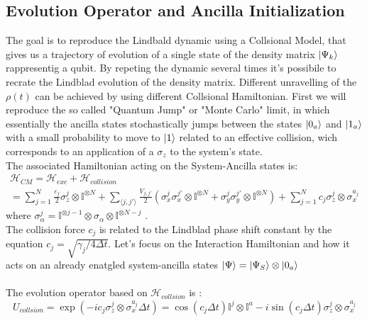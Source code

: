\documentclass[a4paper,12pt]{article}
\begin{document}
	\subsection{Evolution Operator and Ancilla Initialization}
	\label{sub:Evolution_Operator_and_Ancilla_Initialization_QJ}
	The goal is to reproduce the Lindbald dynamic using a Collsional Model, that gives us a trajectory of evolution of a single state of the density matrix $ \ket{\Psi_k} $ rappresentig a qubit. By repeting the dynamic several times it's possibile to recrate the Lindblad evolution of the density matrix.
	Different unravelling of the $ \rho (t) $ can be achieved by using different Collsional Hamiltonian. First we will reproduce the so called "Quantum Jump" or "Monte Carlo" limit, in which essentially the ancilla states stochastically jumps between the states $ \ket{0_a} $ and $ \ket{1_a} $ with a small probability to move to $ \ket{1} $ related to an effective collision, wich corresponds to an application of a $ \sigma_{z} $ to the system's state. \\
	The associated Hamiltonian acting on the System-Ancilla states is:
	\begin{gather}
		\mathcal{H}_{CM} = \mathcal{H}_{exc} + \mathcal{H}_{collision} \\
		= \sum_{j=1}^{N} {\frac{\varepsilon_j}{2} \sigma_{z}^{j} \otimes \mathbb{I}^{\otimes N} } + \sum_{\langle j,j' \rangle} {\frac{V_{j,j'}}{2} \left( \sigma_{x}^{j}\sigma_{x}^{j'} \otimes \mathbb{I}^{\otimes N} + \sigma_{y}^{j}\sigma_{y}^{j'} \otimes \mathbb{I}^{\otimes N} \right)} + \sum_{j=1}^{N}{c_j \sigma_{z}^{j} \otimes \sigma_{x}^{a_j}}
		\label{eq:CM_hamiltonian_QJ}
	\end{gather}
	where $ \sigma_{\alpha}^j = \mathbb{I}^{\otimes j-1} \otimes \sigma_{\alpha} \otimes \mathbb{I}^{\otimes N-j}  $ . \\
	The collision force $ c_j $ is related to the Lindblad phase shift constant by the equation $ c_j = \sqrt{\gamma_j / 4 \Delta t} $.
	Let's focus on the Interaction Hamiltonian and how it acts on an already enatgled system-ancilla states $ \ket{\Psi} = \ket{\Psi_S} \otimes \ket{0_a} $ \\
	\\
	The evolution operator based on $ \mathcal{H}_{collsion} $ is :
	\begin{equation}
		U_{collsion} = \exp \left(-i c_j \sigma_{z}^{j} \otimes \sigma_{x}^{a_j} \Delta t\right) = \cos \left(c_j \Delta t \right) \mathbb{I}^j \otimes \mathbb{I}^a - i \sin \left(c_j \Delta t \right) \sigma_{z}^{j} \otimes \sigma_{x}^{a_j}
		\label{eq:U_QJ}
	\end{equation}
\end{document}
